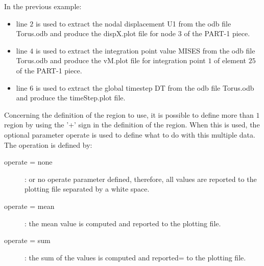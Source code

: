 In the previous example:
\begin{itemize}
\item line $2$ is used to extract the nodal displacement \textsf{U1} from the odb file \textsf{Torus.odb} and produce the \textsf{dispX.plot} file for node $3$ of the \textsf{PART-1} piece.
\item line $4$ is used to extract the integration point value \textsf{MISES} from the odb file \textsf{Torus.odb} and produce the \textsf{vM.plot} file for integration point $1$ of element $25$ of the \textsf{PART-1} piece.
\item line $6$ is used to extract the global timestep \textsf{DT} from the odb file \textsf{Torus.odb} and produce the \textsf{timeStep.plot} file.
\end{itemize}
Concerning the definition of the region to use, it is possible to define more than $1$ region by using the \textsf{'+'} sign in the definition of the region. When this is used, the optional parameter operate is used to define what to do with this multiple data. The operation is defined by:
\begin{description}
\item [operate = none]: or no operate parameter defined, therefore, all values are reported to the plotting file separated by a white space.
\item [operate = mean]: the mean value is computed and reported to the plotting file.
\item [operate = sum]: the sum of the values is computed and reported= to the plotting file.
\end{description}

